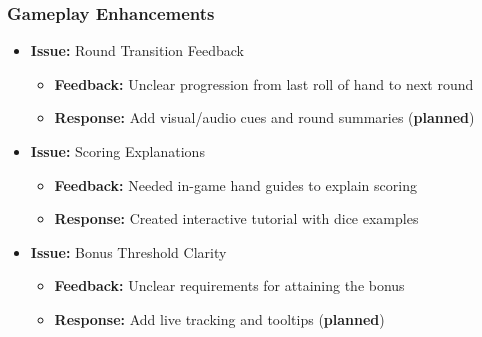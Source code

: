 \documentclass{article}
\begin{document}
\subsubsection{Gameplay Enhancements}
\begin{itemize}
    \item \textbf{Issue:} Round Transition Feedback
    \begin{itemize}
        \item \textbf{Feedback:} Unclear progression from last roll of hand to next round
        \item \textbf{Response:} Add visual/audio cues and round summaries (\textbf{planned})
    \end{itemize}
    
    \item \textbf{Issue:} Scoring Explanations
    \begin{itemize}
        \item \textbf{Feedback:} Needed in-game hand guides to explain scoring
        \item \textbf{Response:} Created interactive tutorial with dice examples
    \end{itemize}
    
    \item \textbf{Issue:} Bonus Threshold Clarity
    \begin{itemize}
        \item \textbf{Feedback:} Unclear requirements for attaining the bonus
        \item \textbf{Response:} Add live tracking and tooltips (\textbf{planned})
    \end{itemize}
\end{itemize}
\end{document}
